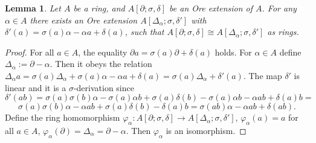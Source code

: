 \documentclass[a4paper,10pt]{article}
\newtheorem{Lemma}[Th]{Lemma}
\theoremstyle{nonumberplain}
\newtheorem{proof}{Proof}
\begin{document}
\begin{Lemma}
\label{OreIso}
Let $A$ be a ring, and $A[\partial; \sigma,\delta]$ be an Ore extension of $A$. 
For any $\alpha \in A$ there exists an Ore extension $A[\Delta_{\alpha}; \sigma,\delta']$
with $\delta'(a) = \sigma(a) \alpha - \alpha a + \delta(a)$, such that 
$A[\partial; \sigma,\delta] \cong A[\Delta_{\alpha}; \sigma,\delta'] $ as rings.
\end{Lemma}
\begin{proof}
For all $a \in A$, the equality $\partial a = \sigma(a) \partial + \delta(a)$ holds. For $\alpha \in A$ define
$\Delta_{\alpha} := \partial - \alpha$. Then it obeys the relation 
$\Delta_{\alpha} a = \sigma(a) \Delta_{\alpha} + \sigma(a) \alpha - \alpha a + \delta(a) 
= \sigma(a)\Delta_{\alpha} + \delta'(a)$.
The map $\delta'$ is linear and it is a $\sigma$-derivation since
\[
\delta'(ab) = \sigma(a) \sigma(b) \alpha - \sigma(a) \alpha b + \sigma(a) \delta(b) -
\sigma(a) \alpha b - \alpha ab + \delta(a)b = 
\] 
\[
\sigma(a) \sigma(b) \alpha - \alpha ab + \sigma(a) \delta(b) - \delta(a)b = 
\sigma(ab) \alpha - \alpha ab + \delta(ab).
\]
Define the ring homomorphism
$\varphi_{\alpha}: A[\partial; \sigma,\delta] \to A[\Delta_{\alpha}; \sigma,\delta']$,
$\varphi_{\alpha}(a)=a$ for all $a \in A$, $\varphi_{\alpha}(\partial)=\Delta_{\alpha}=\partial - \alpha$.
Then $\varphi_{\alpha}$ is an isomorphism.
\end{proof}
\end{document}
